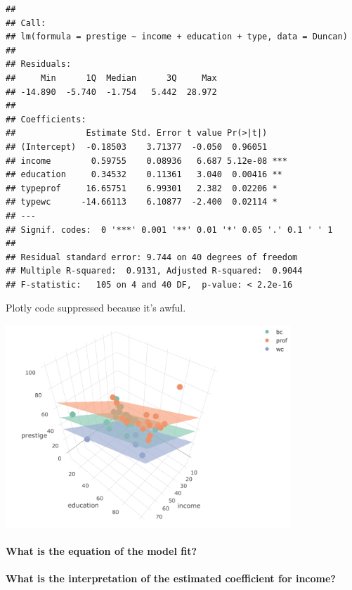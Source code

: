 \documentclass[]{extarticle}
\let\oldparagraph\paragraph
\renewcommand{\paragraph}[1]{\oldparagraph{#1}\mbox{}}
\begin{document}
\begin{verbatim}
## 
## Call:
## lm(formula = prestige ~ income + education + type, data = Duncan)
## 
## Residuals:
##     Min      1Q  Median      3Q     Max 
## -14.890  -5.740  -1.754   5.442  28.972 
## 
## Coefficients:
##              Estimate Std. Error t value Pr(>|t|)    
## (Intercept)  -0.18503    3.71377  -0.050  0.96051    
## income        0.59755    0.08936   6.687 5.12e-08 ***
## education     0.34532    0.11361   3.040  0.00416 ** 
## typeprof     16.65751    6.99301   2.382  0.02206 *  
## typewc      -14.66113    6.10877  -2.400  0.02114 *  
## ---
## Signif. codes:  0 '***' 0.001 '**' 0.01 '*' 0.05 '.' 0.1 ' ' 1
## 
## Residual standard error: 9.744 on 40 degrees of freedom
## Multiple R-squared:  0.9131, Adjusted R-squared:  0.9044 
## F-statistic:   105 on 4 and 40 DF,  p-value: < 2.2e-16
\end{verbatim}

Plotly code suppressed because it's awful.

\includegraphics[height=3in]{plotly_ss_3planes.png}

\paragraph{What is the equation of the model
fit?}\label{what-is-the-equation-of-the-model-fit}

\vspace{3cm}

\paragraph{What is the interpretation of the estimated coefficient for
income?}\label{what-is-the-interpretation-of-the-estimated-coefficient-for-income}
\end{document}
